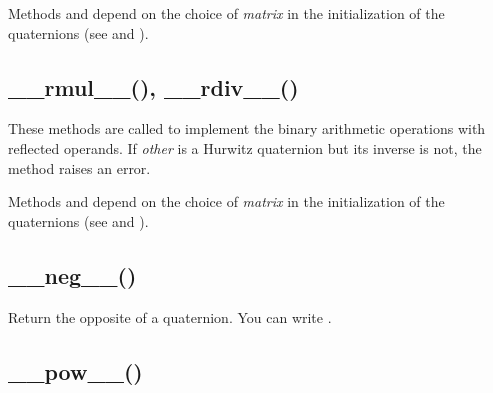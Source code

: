\documentclass[letterpaper,10pt,english]{sphinxmanual}
\begin{document}
Methods  and  depend on the choice of \emph{matrix} in the initialization of the quaternions (see  and ).


\subsection{\_\_rmul\_\_(), \_\_rdiv\_\_()}
\label{methods:rmul-rdiv}

\begin{fulllineitems}
\label{methods:__rmul__}
\end{fulllineitems}


\begin{fulllineitems}
\label{methods:__rdiv__}
\end{fulllineitems}


These methods are called to implement the binary arithmetic operations with reflected operands. If \emph{other} is a Hurwitz quaternion but its inverse is not, the  method raises an error.

Methods  and  depend on the choice of \emph{matrix} in the initialization of the quaternions (see  and ).


\subsection{\_\_neg\_\_()}
\label{methods:neg}

\begin{fulllineitems}
\label{methods:__neg__}
\end{fulllineitems}


Return the opposite of a quaternion. You can write .


\subsection{\_\_pow\_\_()}
\label{methods:pow}

\begin{fulllineitems}
\label{methods:__pow__}
\end{fulllineitems}
\end{document}
